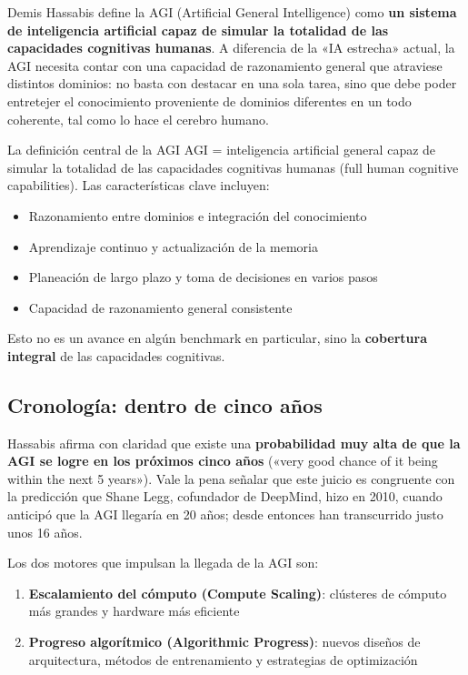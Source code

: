 \documentclass[a4paper]{article}
\begin{document}
Demis Hassabis define la AGI (Artificial General Intelligence) como \textbf{un sistema de inteligencia artificial capaz de simular la totalidad de las capacidades cognitivas humanas}. A diferencia de la «IA estrecha» actual, la AGI necesita contar con una capacidad de razonamiento general que atraviese distintos dominios: no basta con destacar en una sola tarea, sino que debe poder entretejer el conocimiento proveniente de dominios diferentes en un todo coherente, tal como lo hace el cerebro humano.

\begin{importantbox}{La definición central de la AGI}
AGI = inteligencia artificial general capaz de simular la totalidad de las capacidades cognitivas humanas (full human cognitive capabilities). Las características clave incluyen:
\begin{itemize}
    \item Razonamiento entre dominios e integración del conocimiento
    \item Aprendizaje continuo y actualización de la memoria
    \item Planeación de largo plazo y toma de decisiones en varios pasos
    \item Capacidad de razonamiento general consistente
\end{itemize}
Esto no es un avance en algún benchmark en particular, sino la \textbf{cobertura integral} de las capacidades cognitivas.
\end{importantbox}

\subsection{Cronología: dentro de cinco años}

Hassabis afirma con claridad que existe una \textbf{probabilidad muy alta de que la AGI se logre en los próximos cinco años} («very good chance of it being within the next 5 years»). Vale la pena señalar que este juicio es congruente con la predicción que Shane Legg, cofundador de DeepMind, hizo en 2010, cuando anticipó que la AGI llegaría en 20 años; desde entonces han transcurrido justo unos 16 años.

Los dos motores que impulsan la llegada de la AGI son:
\begin{enumerate}
    \item \textbf{Escalamiento del cómputo (Compute Scaling)}: clústeres de cómputo más grandes y hardware más eficiente
    \item \textbf{Progreso algorítmico (Algorithmic Progress)}: nuevos diseños de arquitectura, métodos de entrenamiento y estrategias de optimización
\end{enumerate}
\end{document}
